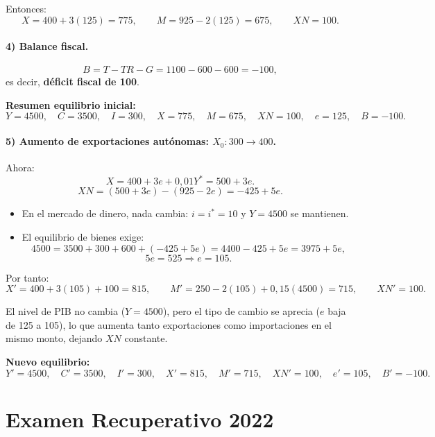 \documentclass[11pt,addpoints]{article}
\begin{document}
Entonces:
\[
X = 400 + 3(125) = 775,\qquad
M = 925 - 2(125) = 675,\qquad
XN = 100.
\]

\paragraph{4) Balance fiscal.}
\[
B = T - TR - G = 1100 - 600 - 600 = -100,
\]
es decir, \textbf{déficit fiscal de 100}.

\textbf{Resumen equilibrio inicial:}
\[
Y = 4500,\quad C = 3500,\quad I = 300,\quad
X = 775,\quad M = 675,\quad XN = 100,\quad e = 125,\quad B = -100.
\]
\newpage
\vspace*{0.5cm}
\paragraph{5) Aumento de exportaciones autónomas: $X_0: 300 \to 400$.}

Ahora:
\[
X = 400 + 3e + 0{,}01Y^* = 500 + 3e.
\]
\[
XN = (500 + 3e) - (925 - 2e) = -425 + 5e.
\]

\begin{itemize}
  \item En el mercado de dinero, nada cambia: $i = i^* = 10$ y $Y = 4500$ se mantienen.
  \item El equilibrio de bienes exige:
  \[
  4500 = 3500 + 300 + 600 + (-425 + 5e) = 4400 - 425 + 5e = 3975 + 5e,
  \]
  \[
  5e = 525 \Rightarrow e = 105.
  \]
\end{itemize}

Por tanto:
\[
X' = 400 + 3(105) + 100 = 815,\qquad
M' = 250 - 2(105) + 0{,}15(4500) = 715,\qquad
XN' = 100.
\]

El nivel de PIB no cambia ($Y=4500$), pero el tipo de cambio se aprecia ($e$ baja de 125 a 105), lo que aumenta tanto exportaciones como importaciones en el mismo monto, dejando $XN$ constante.

\medskip
\textbf{Nuevo equilibrio:}
\[
Y' = 4500,\quad C' = 3500,\quad I' = 300,\quad
X' = 815,\quad M' = 715,\quad XN' = 100,\quad e' = 105,\quad B' = -100.
\]

\newpage
\vspace*{0.1cm}
\section*{Examen Recuperativo 2022}
\end{document}
